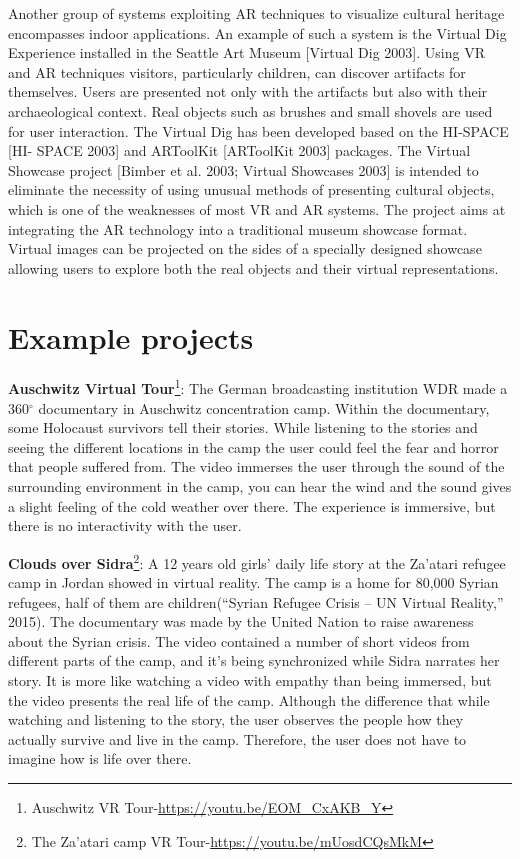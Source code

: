 Another group of systems exploiting AR techniques to visualize cultural heritage encompasses indoor applications. An example of such a system is the Virtual Dig Experience installed in the Seattle Art Museum [Virtual Dig 2003]. Using VR and AR techniques visitors, particularly children, can discover artifacts for themselves. Users are presented not only with the artifacts but also with their archaeological context. Real objects such as brushes and small shovels are used for user interaction. The Virtual Dig has been developed based on the HI-SPACE [HI- SPACE 2003] and ARToolKit [ARToolKit 2003] packages.
The Virtual Showcase project [Bimber et al. 2003; Virtual Showcases 2003] is intended to eliminate the necessity of using unusual methods of presenting cultural objects, which is one of the weaknesses of most VR and AR systems. The project aims at integrating the AR technology into a traditional museum showcase format. Virtual images can be projected on the sides of a specially designed showcase allowing users to explore both the real objects and their virtual representations.
\citep{Rahaman2011InterpretingPerspective}

\section{Example projects}
\textbf{Auschwitz Virtual Tour}\footnote{Auschwitz VR Tour-\url{https://youtu.be/EOM_CxAKB_Y}}: The German broadcasting institution WDR made a 360$^{\circ}$
documentary in Auschwitz concentration camp. Within the documentary, some Holocaust
survivors tell their stories. While listening to the stories and seeing the different locations in
the camp the user could feel the fear and horror that people suffered from. The video
immerses the user through the sound of the surrounding environment in the camp, you can
hear the wind and the sound gives a slight feeling of the cold weather over there. The
experience is immersive, but there is no interactivity with the user.


\textbf{Clouds over Sidra}\footnote{The Za’atari camp VR Tour-\url{https://youtu.be/mUosdCQsMkM}}: A 12 years old girls’ daily life story at the Za’atari refugee camp in Jordan
showed in virtual reality. The camp is a home for 80,000 Syrian refugees, half of them are
children(“Syrian Refugee Crisis – UN Virtual Reality,” 2015). The documentary was made by
the United Nation to raise awareness about the Syrian crisis. The video contained a number
of short videos from different parts of the camp, and it’s being synchronized while Sidra
narrates her story. It is more like watching a video with empathy than being immersed, but
the video presents the real life of the camp. Although the difference that while watching and
listening to the story, the user observes the people how they actually survive and live in the
camp. Therefore, the user does not have to imagine how is life over there.


